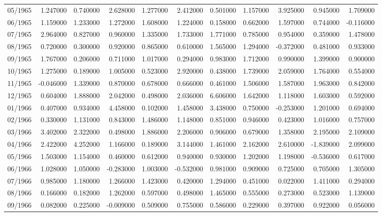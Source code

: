 \begin{tabular}{lrrrrrrrrrr}
05/1965 & 1.247000 & 0.740000 & 2.628000 & 1.277000 & 2.412000 & 0.501000 & 1.157000 & 3.925000 & 0.945000 & 1.709000 \\
06/1965 & 1.159000 & 1.233000 & 1.272000 & 1.608000 & 1.224000 & 0.158000 & 0.662000 & 1.597000 & 0.744000 & -0.116000 \\
07/1965 & 2.964000 & 0.827000 & 0.960000 & 1.335000 & 1.733000 & 1.771000 & 0.785000 & 0.954000 & 0.359000 & 1.478000 \\
08/1965 & 0.720000 & 0.300000 & 0.920000 & 0.865000 & 0.610000 & 1.565000 & 1.294000 & -0.372000 & 0.481000 & 0.933000 \\
09/1965 & 1.767000 & 0.206000 & 0.711000 & 1.017000 & 0.294000 & 0.983000 & 1.712000 & 0.990000 & 1.399000 & 0.900000 \\
10/1965 & 1.275000 & 0.189000 & 1.005000 & 0.523000 & 2.920000 & 0.438000 & 1.739000 & 2.059000 & 1.764000 & 0.554000 \\
11/1965 & -0.046000 & 1.339000 & 0.870000 & 0.678000 & 0.666000 & 0.461000 & 1.506000 & 1.587000 & 1.963000 & 0.842000 \\
12/1965 & 0.604000 & 1.888000 & 2.042000 & 0.498000 & 2.036000 & 6.606000 & 1.642000 & 1.118000 & 1.603000 & 0.592000 \\
01/1966 & 0.407000 & 0.934000 & 4.458000 & 0.102000 & 1.458000 & 3.438000 & 0.750000 & -0.253000 & 1.201000 & 0.694000 \\
02/1966 & 0.330000 & 1.131000 & 0.843000 & 1.486000 & 1.148000 & 0.851000 & 0.946000 & 0.423000 & 1.016000 & 0.757000 \\
03/1966 & 3.402000 & 2.322000 & 0.498000 & 1.886000 & 2.206000 & 0.906000 & 0.679000 & 1.358000 & 2.195000 & 2.109000 \\
04/1966 & 2.422000 & 4.252000 & 1.166000 & 0.189000 & 3.144000 & 1.461000 & 2.162000 & 2.610000 & -1.839000 & 2.099000 \\
05/1966 & 1.503000 & 1.154000 & 0.460000 & 0.612000 & 0.940000 & 0.930000 & 1.202000 & 1.198000 & -0.536000 & 0.617000 \\
06/1966 & 1.028000 & 1.050000 & -0.283000 & 1.003000 & -0.532000 & 0.981000 & 0.909000 & 0.725000 & 0.705000 & 1.305000 \\
07/1966 & 0.985000 & 1.180000 & 1.266000 & 1.423000 & 0.420000 & 1.294000 & 0.451000 & 0.022000 & 1.411000 & 0.294000 \\
08/1966 & 0.166000 & 0.182000 & 1.262000 & 0.597000 & 0.498000 & 1.465000 & 0.555000 & 0.273000 & 0.523000 & 1.139000 \\
09/1966 & 0.082000 & 0.225000 & -0.009000 & 0.509000 & 0.755000 & 0.586000 & 0.229000 & 0.397000 & 0.922000 & 0.056000 \\

\end{tabular}
